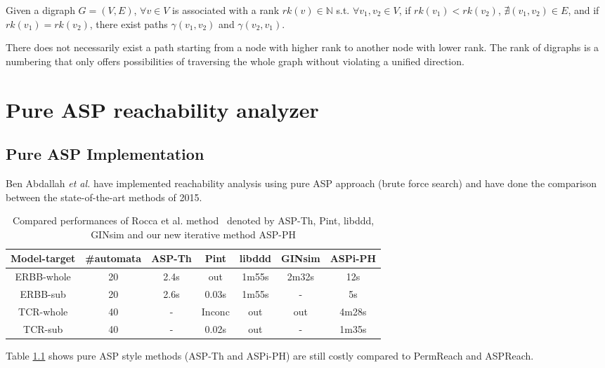 \begin{definition}\label{def:rank}
Given a digraph $G=(V,E)$, $\forall v\in V$ is associated with a rank $rk(v)\in \mathbb{N}$ s.t. $\forall v_1,v_2\in V$, if $rk(v_1)<rk(v_2)$, $\nexists (v_1,v_2)\in E$, and if $rk(v_1)=rk(v_2)$, there exist paths $\gamma(v_1,v_2)$ and $\gamma(v_2,v_1)$.
\end{definition}
\begin{remark}
There does not necessarily exist a path starting from a node with higher rank to another node with lower rank.
The rank of digraphs is a numbering that only offers possibilities of traversing the whole graph without violating a unified direction.
\end{remark}


\chapter{Pure ASP reachability analyzer}\label{chap:pureASP}
\section{Pure ASP Implementation}\label{sec:pureASP}
Ben Abdallah \textit{et al.} \cite{abdallah2015exhaustive} have implemented reachability analysis using pure ASP approach (brute force search) and have done the comparison between the state-of-the-art methods of 2015.

\begin{table}[ht]
    \centering
    \footnotesize
    \begin{tabular}{c|c|c|c|c|c|c}
        Model-target & \#automata & ASP-Th & Pint & libddd & GINsim & ASPi-PH\\
        \hline
        ERBB-whole & 20& 2.4s& out& 1m55s& 2m32s& 12s\\
        \hline
        ERBB-sub& 20& 2.6s& 0.03s& 1m55s& -& 5s\\
        \hline
        TCR-whole& 40& - &Inconc& out& out& 4m28s\\
        \hline
        TCR-sub& 40 &- &0.02s& out& -& 1m35s
    \end{tabular}
    \caption[Performance of pure ASP method]{Compared performances of Rocca et al. method~\cite{rocca2014asp} denoted by ASP-Th, Pint, libddd, GINsim and our new iterative method ASP-PH}
    \label{tab:pureAsp}
\end{table}

Table \ref{tab:pureAsp} shows pure ASP style methods (ASP-Th and ASPi-PH) are still costly compared to PermReach and ASPReach.
